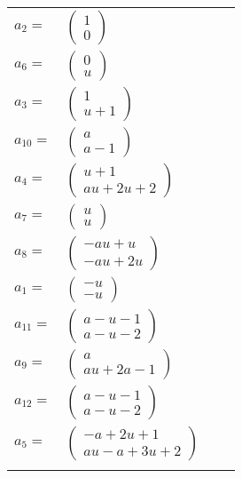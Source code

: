 \documentclass[1p]{elsarticle_modified}
\theoremstyle{definition}
\begin{document}
\begin{tabular}{m{7pt} m{180pt} m{7pt} m{180pt} }
\flushright $a_{2}=$&$\begin{pmatrix}1\\0\end{pmatrix}$ \\
\flushright $a_{6}=$&$\begin{pmatrix}0\\u\end{pmatrix}$ \\
\flushright $a_{3}=$&$\begin{pmatrix}1\\u+1\end{pmatrix}$ \\
\flushright $a_{10}=$&$\begin{pmatrix}a\\a-1\end{pmatrix}$ \\
\flushright $a_{4}=$&$\begin{pmatrix}u+1\\a u+2 u+2\end{pmatrix}$ \\
\flushright $a_{7}=$&$\begin{pmatrix}u\\u\end{pmatrix}$ \\
\flushright $a_{8}=$&$\begin{pmatrix}- a u+u\\- a u+2 u\end{pmatrix}$ \\
\flushright $a_{1}=$&$\begin{pmatrix}- u\\- u\end{pmatrix}$ \\
\flushright $a_{11}=$&$\begin{pmatrix}a- u-1\\a- u-2\end{pmatrix}$ \\
\flushright $a_{9}=$&$\begin{pmatrix}a\\a u+2 a-1\end{pmatrix}$ \\
\flushright $a_{12}=$&$\begin{pmatrix}a- u-1\\a- u-2\end{pmatrix}$ \\
\flushright $a_{5}=$&$\begin{pmatrix}- a+2 u+1\\a u- a+3 u+2\end{pmatrix}$\\&\end{tabular}
\end{document}
